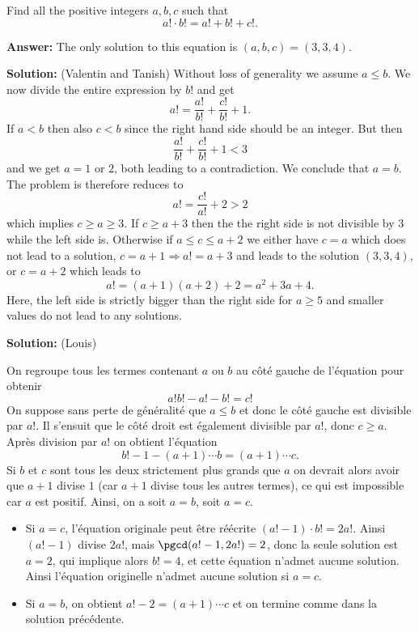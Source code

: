 Find all the positive integers $a,b,c$ such that
$$a!\cdot b!=a!+b!+c!.$$

\textbf{Answer:} The only solution to this equation is $(a,b,c) = (3,3,4)$.

\textbf{Solution:} (Valentin and Tanish)
Without loss of generality we assume $a\leq b$. We now divide the entire expression by $b!$ and get
$$a!=\frac{a!}{b!}+\frac{c!}{b!}+1.$$
If $a < b$ then also $c < b$ since the right hand side should be an integer. But then
$$\frac{a!}{b!}+\frac{c!}{b!}+1 < 3$$
and we get $a = 1$ or $2$, both leading to a contradiction. We conclude that $a=b$. The problem is therefore reduces to
$$a!=\frac{c!}{a!}+2 > 2$$
which implies $c\geq a\geq 3$. If $c\geq a+3$ then the the right side is not divisible by $3$ while the left side is. Otherwise if $a\leq c \leq a+2$ we either have $c = a$ which does not lead to a solution, $c = a+1 \Longrightarrow a!=a+3$ and leads to the solution $(3,3,4)$, or $c=a+2$ which leads to 
$$a!=(a+1)(a+2)+2 = a^2+3a+4.$$
Here, the left side is strictly bigger than the right side for $a\geq 5$ and smaller values do not lead to any solutions.

\textbf{Solution:} (Louis)

On regroupe tous les termes contenant $a$ ou $b$ au côté gauche de l'équation pour obtenir 
$$a!b! - a! - b! = c!$$
On suppose sans perte de généralité que $a\leq b$ et donc le côté gauche est divisible par $a!$. Il s'ensuit que le côté droit est également divisible par $a!$, donc $c \geq a$. Après division par $a!$ on obtient l'équation 
$$b! - 1 - (a+1)\cdots b = (a+1)\cdots c.$$
Si $b$ et $c$ sont tous les deux strictement plus grands que $a$ on devrait alors avoir que $a+1$ divise $1$ (car $a+1$ divise tous les autres termes), ce qui est impossible car $a$ est positif. Ainsi, on a soit $a=b$, soit $a=c$.
\begin{itemize}
    \item Si $a = c$, l'équation originale peut être réécrite $(a! - 1)\cdot b! = 2a!$. Ainsi $(a! - 1)$ divise $2a!$, mais $\pgcd(a! - 1, 2a!) = 2$, donc la seule solution est $a = 2$, qui implique alors $b! = 4$, et cette équation n'admet aucune solution. Ainsi l'équation originelle n'admet aucune solution si $a=c$.
    \item Si $a = b$, on obtient $a! - 2 = (a+1)\cdots c$ et on termine comme dans la solution précédente. 
\end{itemize}

\newpage

